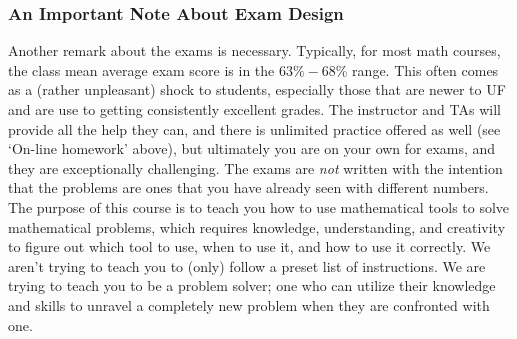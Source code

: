 \documentclass{ximera}
\begin{document}
%    
    
\subsubsection*{An Important Note About Exam Design}
    
    Another remark about the exams is necessary. Typically, for most math courses, the class mean average exam score is in the $63\%-68$\% range. This often comes as a (rather unpleasant) shock to students, especially those that are newer to UF and are use to getting consistently excellent grades. The instructor and TAs will provide all the help they can, and there is unlimited practice offered as well (see `On-line homework' above), but ultimately you are on your own for exams, and they are exceptionally challenging. The exams are \textit{not} written with the intention that the problems are ones that you have already seen with different numbers. The purpose of this course is to teach you how to use mathematical tools to solve mathematical problems, which requires knowledge, understanding, and creativity to figure out which tool to use, when to use it, and how to use it correctly. We aren't trying to teach you to (only) follow a preset list of instructions. We are trying to teach you to be a problem solver; one who can utilize their knowledge and skills to unravel a completely new problem when they are confronted with one.
\end{document}

